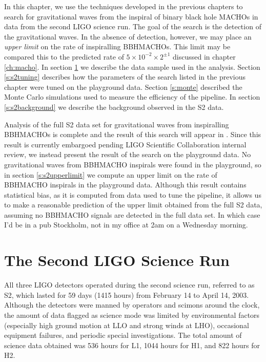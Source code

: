 
In this chapter, we use the techniques developed in the previous chapters to
search for gravitational waves from the inspiral of binary black hole MACHOs
in data from the second LIGO science run.  The goal of the search is the
detection of the gravitational waves. In the absence of detection, however, we
may place an \emph{upper limit} on the rate of inspiralling BBHMACHOs. This
limit may be compared this to the predicted rate of $5 \times 10^{-2} \times
2^{\pm 1}$ discussed in chapter \ref{ch:macho}.  In section \ref{s:s2run} we
describe the data sample used in the analysis.  Section \ref{s:s2tuning}
describes how the parameters of the search listed in the previous chapter were
tuned on the playground data. Section \ref{s:monte} described the Monte Carlo
simulations used to measure the efficiency of the pipeline. In section
\ref{s:s2background} we describe the background observed in the S2 data.

Analysis of the full S2 data set for gravitational waves from inspiralling
BBHMACHOs is complete and the result of this search will appear in
\cite{S2Macho:2004}. Since this result is currently embargoed pending LIGO
Scientific Collaboration internal review, we instead present the result of the
search on the playground data. No gravitational waves from BBHMACHO inspirals
were found in the playground, so in section \ref{s:s2upperlimit} we compute
an upper limit on the rate of BBHMACHO inspirals in the playground data.
Although this result contains statistical bias, as it is computed from data
used to tune the pipeline, it allows us to make a reasonable prediction of the
upper limit obtained from the full S2 data, assuming no BBHMACHO signals are
detected in the full data set. In which case I'd be in a pub Stockholm, not in
my office at 2am on a Wednesday morning.

\section{The Second LIGO Science Run}
\label{s:s2run}

All three LIGO detectors operated during the second science run, referred to
as S2, which lasted for 59 days (1415 hours) from February 14 to April 14,
2003.  Although the detectors were manned by operators and scimons around
the clock, the amount of data flagged as science mode was limited by
environmental factors (especially high ground motion at LLO and strong winds
at LHO), occasional equipment failures, and periodic special investigations.
The total amount of science data obtained was 536 hours for L1, 1044 hours for
H1, and 822 hours for H2.

